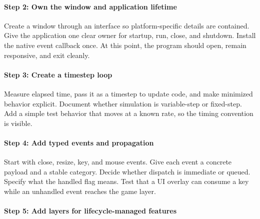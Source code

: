 \paragraph{Step 2: Own the window and application lifetime}\label{06-engine-ii-ch042-step-2-own-the-window-and-application-lifetime}

\hypertarget{06-engine-ii-ch042-step-2-own-the-window-and-application-lifetime}{}

Create a window through an interface so platform-specific details are contained. Give the application one clear owner for startup, run, close, and shutdown. Install the native event callback once. At this point, the program should open, remain responsive, and exit cleanly.

\paragraph{Step 3: Create a timestep loop}\label{06-engine-ii-ch042-step-3-create-a-timestep-loop}

\hypertarget{06-engine-ii-ch042-step-3-create-a-timestep-loop}{}

Measure elapsed time, pass it as a timestep to update code, and make minimized behavior explicit. Document whether simulation is variable-step or fixed-step. Add a simple test behavior that moves at a known rate, so the timing convention is visible.

\paragraph{Step 4: Add typed events and propagation}\label{06-engine-ii-ch042-step-4-add-typed-events-and-propagation}

\hypertarget{06-engine-ii-ch042-step-4-add-typed-events-and-propagation}{}

Start with close, resize, key, and mouse events. Give each event a concrete payload and a stable category. Decide whether dispatch is immediate or queued. Specify what the handled flag means. Test that a UI overlay can consume a key while an unhandled event reaches the game layer.

\paragraph{Step 5: Add layers for lifecycle-managed features}\label{06-engine-ii-ch042-step-5-add-layers-for-lifecycle-managed-features}

\hypertarget{06-engine-ii-ch042-step-5-add-layers-for-lifecycle-managed-features}{}

